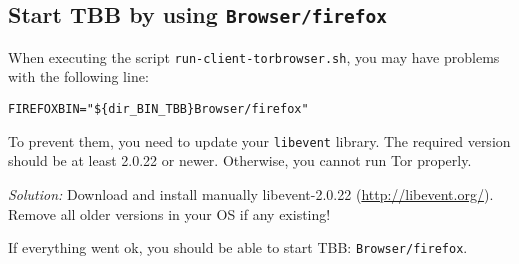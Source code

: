 \subsection{Start \acs{TBB} by using \texttt{Browser/firefox}}
\label{subsec:tbb_start}

When executing the script \texttt{run-client-torbrowser.sh}, you may have problems with the following line:
\vspace{-2mm}
\begin{verbatim}
FIREFOXBIN="${dir_BIN_TBB}Browser/firefox"
\end{verbatim}
\vspace{-2mm}
To prevent them, you need to update your \texttt{libevent} library. The required version should be at least 2.0.22 or newer. Otherwise, you cannot run Tor properly.

\emph{Solution:} Download and install manually libevent-2.0.22 (\url{http://libevent.org/}). Remove all older versions in your \acs{OS} if any existing!

If everything went ok, you should be able to start \ac{TBB}: \texttt{Browser/firefox}.



